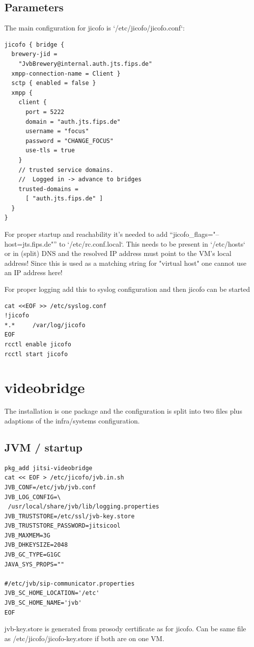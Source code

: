 \documentclass[conference]{IEEEtran}
\begin{document}
\subsection{Parameters}

The main configuration for jicofo is `/etc/jicofo/jicofo.conf`:
\begin{verbatim}
jicofo { bridge {
  brewery-jid = 
    "JvbBrewery@internal.auth.jts.fips.de"
  xmpp-connection-name = Client }
  sctp { enabled = false }
  xmpp {
    client {
      port = 5222
      domain = "auth.jts.fips.de"
      username = "focus"
      password = "CHANGE_FOCUS"
      use-tls = true
    }
    // trusted service domains. 
    //  Logged in -> advance to bridges
    trusted-domains = 
      [ "auth.jts.fips.de" ]
  }
}
\end{verbatim}
For proper startup and reachability it's needed to add ``jicofo\_flags="--host=jts.fips.de"''
to `/etc/rc.conf.local`. This needs to be present in `/etc/hosts` or in (split) DNS and the
resolved IP address must point to the VM's local address! Since this is used as a matching
string for "virtual host" one cannot use an IP address here!

For proper logging add this to syslog configuration and then jicofo can be started
\begin{verbatim}
cat <<EOF >> /etc/syslog.conf
!jicofo
*.*     /var/log/jicofo
EOF
rcctl enable jicofo
rcctl start jicofo
\end{verbatim}

\section{videobridge}
The installation is one package and the configuration is split into two files plus
adaptions of the infra/systems configuration.
\subsection{JVM / startup}

\begin{verbatim}
pkg_add jitsi-videobridge
cat << EOF > /etc/jicofo/jvb.in.sh
JVB_CONF=/etc/jvb/jvb.conf
JVB_LOG_CONFIG=\
 /usr/local/share/jvb/lib/logging.properties
JVB_TRUSTSTORE=/etc/ssl/jvb-key.store
JVB_TRUSTSTORE_PASSWORD=jitsicool
JVB_MAXMEM=3G
JVB_DHKEYSIZE=2048
JVB_GC_TYPE=G1GC
JAVA_SYS_PROPS=""

#/etc/jvb/sip-communicator.properties
JVB_SC_HOME_LOCATION='/etc'
JVB_SC_HOME_NAME='jvb'
EOF
\end{verbatim}
jvb-key.store is generated from prosody certificate as for jicofo. Can be same file 
as /etc/jicofo/jicofo-key.store if both are on one VM.
\end{document}
